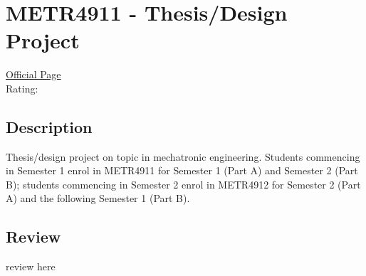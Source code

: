 \hypertarget{METR4911}{\section{METR4911 - Thesis/Design Project}}

\large
\textcolor{turbo_purple}{\href{https://my.uq.edu.au/programs-courses/course.html?course_code=METR4911}{Official Page}} \\
Rating: \cstar\cstar\cstar\cstar\ostar

\normalsize
\subsection*{Description}
Thesis/design project on topic in mechatronic engineering.
Students commencing in Semester 1 enrol in METR4911 for Semester 1 (Part A) and Semester 2 (Part B); students commencing in Semester 2 enrol in METR4912 for Semester 2 (Part A) and the following Semester 1 (Part B).

\subsection*{Review}
review here
